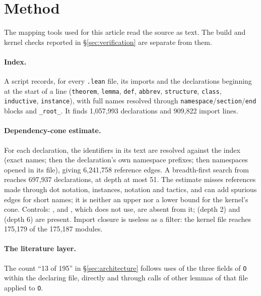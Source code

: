 \section{Method}\label{app:method}

The mapping tools used for this article read the source as text. The build and kernel checks
reported in \S\ref{sec:verification} are separate from them.

\paragraph{Index.} A script records, for every \texttt{.lean} file, its imports and the declarations
beginning at the start of a line (\texttt{theorem}, \texttt{lemma}, \texttt{def}, \texttt{abbrev},
\texttt{structure}, \texttt{class}, \texttt{inductive}, \texttt{instance}), with full names resolved
through \texttt{namespace}/\texttt{section}/\texttt{end} blocks and \texttt{\_root\_}. It finds
1{,}057{,}993 declarations and 909{,}822 import lines.

\paragraph{Dependency-cone estimate.} For each declaration, the identifiers in its text are resolved
against the index (exact names; then the declaration's own namespace prefixes; then namespaces opened
in its file), giving 6{,}241{,}758 reference edges. A breadth-first search from 
reaches 697{,}937 declarations, at depth at most 51. The estimate misses references made through dot
notation, instances, notation and tactics, and can add spurious edges for short names; it is neither
an upper nor a lower bound for the kernel's cone. Controls: ,  and
, which  does not use, are
absent from it;  (depth 2) and  (depth 6) are present.
Import closure is useless as a filter: the kernel file reaches 175{,}179 of the 175{,}187 modules.

\paragraph{The literature layer.} The count ``13 of 195'' in \S\ref{sec:architecture} follows uses of
the three fields of \texttt{O} within the declaring file, directly and through calls of other lemmas of
that file applied to \texttt{O}.

